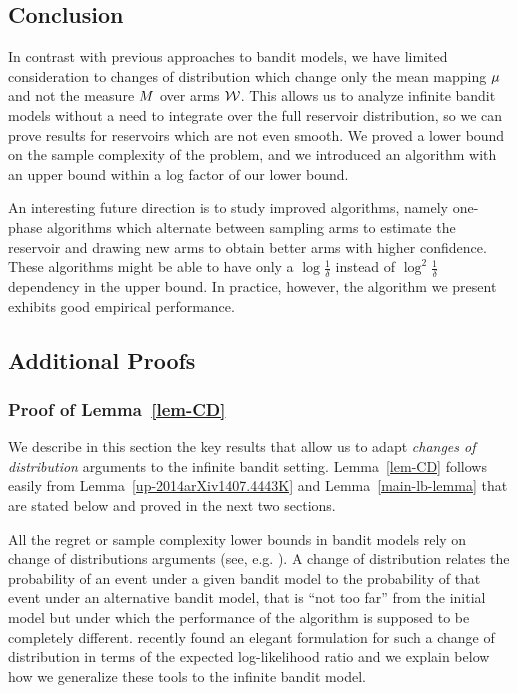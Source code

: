 \subsection{Conclusion}\label{sec-conclusion}
In contrast with previous approaches to bandit models, we have
limited consideration to changes of distribution which change only the mean mapping 
$\mu$ and not the measure $M$ over arms $\mathcal{W}$.
This allows us to analyze infinite bandit models without a need to integrate
over the full reservoir distribution, so we can prove results for reservoirs
which are not even smooth.
We proved a lower bound on the sample complexity of the problem,
and we introduced an algorithm with an upper bound within a log factor of our
lower bound.

An interesting future direction is to study improved algorithms, namely
one-phase algorithms which alternate between sampling arms to estimate the 
reservoir and drawing new arms to obtain better arms with higher confidence.
These algorithms might be able to have only a $\log\frac{1}{\delta}$ instead of
$\log^2 \frac{1}{\delta}$ dependency in the upper bound.
In practice, however, the algorithm we present exhibits good empirical 
performance.

\newpage
%

\subsection{Additional Proofs}\label{supp-proofs}

\subsubsection{Proof of Lemma~\ref{lem-CD}} \label{proof-CD}

We describe in this section the key results that allow us to adapt
\emph{changes of distribution} arguments to the infinite bandit setting.
Lemma~\ref{lem-CD} follows easily from Lemma~\ref{up-2014arXiv1407.4443K} and 
Lemma~\ref{main-lb-lemma} that are stated below and proved in the next two sections.

All the regret or sample complexity lower bounds in bandit models rely on
change of distributions arguments (see, e.g.
\cite{LaiRobbins85bandits,BurnKat96,Bubeck10BestArm}). A change of distribution
relates the probability of an event under a given bandit model to the
probability of that event under an alternative bandit model, that is ``not too
far'' from the initial model but under which the performance of the algorithm
is supposed to be completely different. \cite{Combes14Lip,JMLR15} recently
found an elegant formulation for such a change of distribution in terms of the
expected log-likelihood ratio and we explain below how we generalize these
tools to the infinite bandit model.

